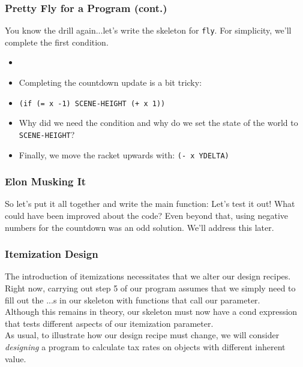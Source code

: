 \documentclass{beamer}
\begin{document}
\begin{frame}
  \frametitle{Pretty Fly for a Program (cont.)}
  You know the drill again...let's write the skeleton for
  \texttt{fly}. For simplicity, we'll complete the
  first condition.
  \begin{itemize}
  \item<2-> \flySkeleton
  \item<3-> Completing the countdown update is a bit tricky:
  \item<4-> \texttt{(if (= x -1) SCENE-HEIGHT (+ x 1))}
  \item<5-> Why did we need the condition and why do we set
    the state of the world to \texttt{SCENE-HEIGHT}?
  \item<6-> Finally, we move the racket upwards with:
    \texttt{(- x YDELTA)}
  \end{itemize}  
\end{frame}


\begin{frame}
  \frametitle{Elon Musking It}
  So let's put it all together and write the main function:
  \pause
  \main
  \pause
  Let's test it out!
  \pause
  What could have been improved about the code?
  \pause
  Even beyond that, using negative numbers for the countdown
  was an odd solution. We'll address this later.
\end{frame}

\begin{frame}
  \frametitle{Itemization Design}
  The introduction of itemizations necessitates that we alter
  our design recipes.\\
  \pause
  Right now, carrying out step 5 of our program assumes that we simply need to
  fill out the ...s in our skeleton with functions that call our parameter.\\
  \pause
  Although this remains in theory, our skeleton must now have a cond expression
  that tests different aspects of our itemization parameter.\\
  \pause
  As usual, to illustrate how our design recipe must change, we will consider
  \emph{designing} a program to calculate tax rates on objects with different
  inherent value.   
\end{frame}
\end{document}
